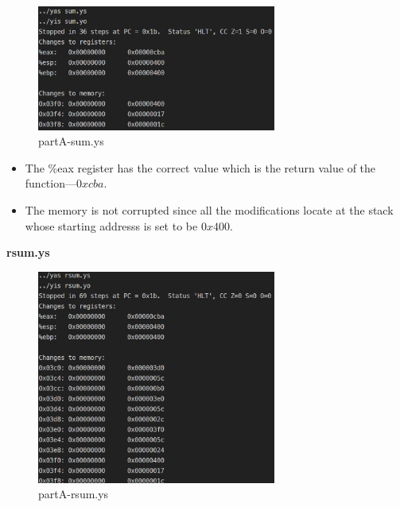 \documentclass{article}
\begin{document}
\begin{figure}[H] %
        \centering %
        \includegraphics[width=0.7\textwidth]{partA-sum.jpg} %
        \caption{partA-sum.ys} %
        \label{Fig.partA-sum} %
\end{figure}
\begin{itemize}
        \item The \%eax register has the correct value which is the return value of the function---$0xcba$.
        \item The memory is not corrupted since all the modifications locate at the stack whose starting addresss is set to be $0x400$.
\end{itemize}
\textbf{rsum.ys}\\

\begin{figure}[H] %
        \centering %
        \includegraphics[width=0.7\textwidth]{partA-rsum.jpg} %
        \caption{partA-rsum.ys} %
        \label{Fig.partA-rsum} %
\end{figure}
\end{document}
